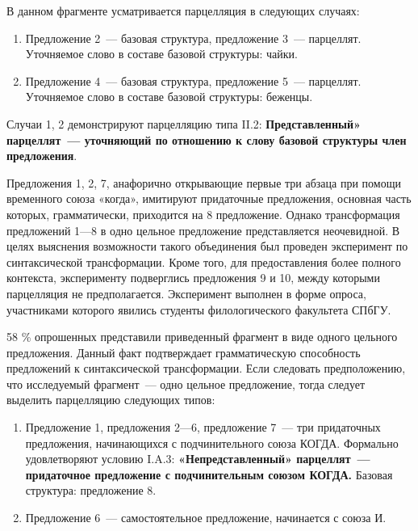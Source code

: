 \documentclass{kursa4}
\begin{document}
      В данном фрагменте усматривается парцелляция в следующих случаях: \begin{enumerate}
        \item Предложение 2~--- базовая структура, предложение 3~--- парцеллят. \newline
        Уточняемое слово в составе базовой структуры: чайки. 

        \item Предложение 4~--- базовая структура, предложение 5~--- парцеллят. \newline
        Уточняемое слово в составе базовой структуры: беженцы. 
      \end{enumerate}

      Случаи 1, 2 демонстрируют парцелляцию типа II.2: \textbf{Представленный» парцеллят~--- уточняющий по отношению к слову базовой структуры член предложения}. 

      Предложения 1, 2, 7, анафорично открывающие первые три абзаца при помощи временного союза «когда», имитируют придаточные предложения, основная часть которых, грамматически, приходится на 8 предложение. Однако трансформация предложений 1—8 в одно цельное предложение представляется неочевидной. В целях выяснения возможности такого объединения был проведен эксперимент по синтаксической трансформации. Кроме того, для предоставления более полного контекста, эксперименту подверглись предложения 9 и 10, между которыми парцелляция не предполагается. Эксперимент выполнен в форме опроса, участниками которого явились студенты филологического факультета СПбГУ. 

      58 \% опрошенных представили приведенный фрагмент в виде одного цельного предложения. Данный факт подтверждает грамматическую способность предложений к синтаксической трансформации. Если следовать предположению, что исследуемый фрагмент~--- одно цельное предложение, тогда следует выделить парцелляцию следующих типов: 

      \begin{enumerate}
        \item Предложение 1, предложения 2—6, предложение 7~--- три придаточных предложения, начинающихся с подчинительного союза КОГДА. \newline
        Формально удовлетворяют условию I.A.3: \textbf{«Непредставленный» парцеллят~--- придаточное предложение с подчинительным союзом КОГДА.} Базовая структура: предложение 8. \item Предложение 6~--- самостоятельное предложение, начинается с союза И. \end{enumerate}
\end{document}
